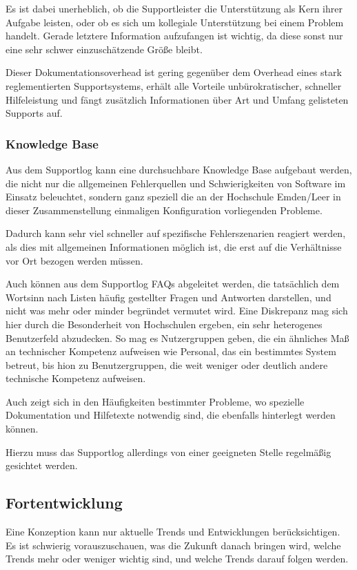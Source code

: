 Es ist dabei unerheblich, ob die Supportleister die Unterstützung als Kern ihrer Aufgabe 
leisten, oder ob es sich um kollegiale Unterstützung bei einem Problem handelt. Gerade 
letztere Information aufzufangen ist wichtig, da diese sonst nur eine sehr schwer 
einzuschätzende Größe bleibt.

Dieser Dokumentationsoverhead ist gering gegenüber dem Overhead eines stark 
reglementierten Supportsystems, erhält alle Vorteile unbürokratischer, schneller 
Hilfeleistung und fängt zusätzlich Informationen über Art und Umfang gelisteten Supports 
auf.

\subsubsection{Knowledge Base}
Aus dem Supportlog kann eine durchsuchbare Knowledge Base aufgebaut werden, die nicht 
nur die allgemeinen Fehlerquellen und Schwierigkeiten von Software im Einsatz beleuchtet, 
sondern ganz speziell die an der Hochschule Emden/Leer in dieser Zusammenstellung 
einmaligen Konfiguration vorliegenden Probleme.

Dadurch kann sehr viel schneller auf spezifische Fehlerszenarien reagiert werden, als dies 
mit allgemeinen Informationen möglich ist, die erst auf die Verhältnisse vor Ort bezogen 
werden müssen.

Auch können aus dem Supportlog FAQs abgeleitet werden, die tatsächlich dem Wortsinn 
nach Listen häufig gestellter Fragen und Antworten darstellen, und nicht was mehr oder 
minder begründet vermutet wird. Eine Diskrepanz mag sich hier durch die Besonderheit von 
Hochschulen ergeben, ein sehr heterogenes Benutzerfeld abzudecken. So mag es 
Nutzergruppen geben, die ein ähnliches Maß an technischer Kompetenz aufweisen wie 
Personal, das ein bestimmtes System betreut, bis hion zu Benutzergruppen, die weit weniger 
oder deutlich andere technische Kompetenz aufweisen.

Auch zeigt sich in den Häufigkeiten bestimmter Probleme, wo spezielle Dokumentation und 
Hilfetexte notwendig sind, die ebenfalls hinterlegt werden können.

Hierzu muss das Supportlog allerdings von einer geeigneten Stelle regelmäßig gesichtet 
werden.

\subsection{Fortentwicklung}
Eine Konzeption kann nur aktuelle Trends und Entwicklungen berücksichtigen. Es ist 
schwierig vorauszuschauen, was die Zukunft danach bringen wird, welche Trends mehr oder 
weniger wichtig sind, und welche Trends darauf folgen werden.


